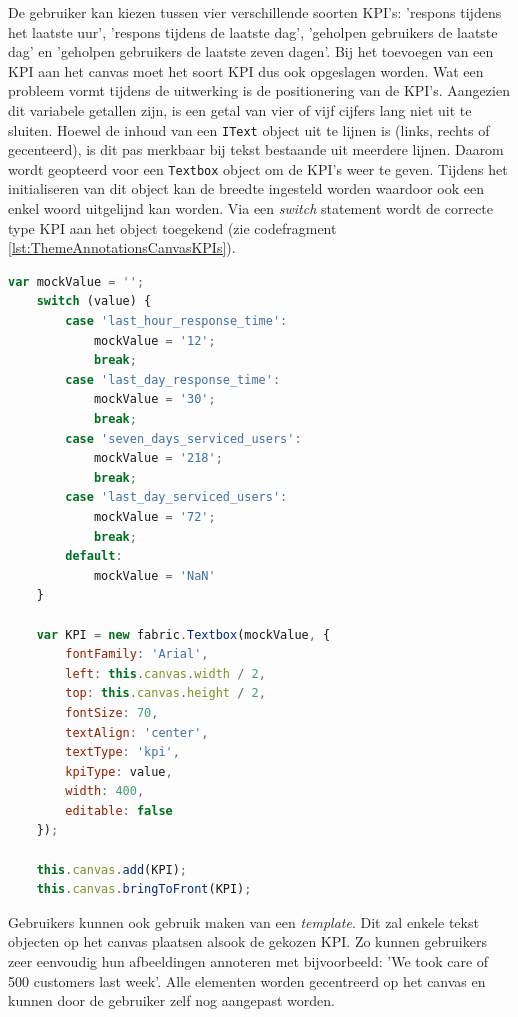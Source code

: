De gebruiker kan kiezen tussen vier verschillende soorten KPI's: 'respons tijdens het laatste uur', 'respons tijdens de laatste dag', 'geholpen gebruikers de laatste dag' en 'geholpen gebruikers de laatste zeven dagen'. Bij het toevoegen van een KPI aan het canvas moet het soort KPI dus ook opgeslagen worden. %
Wat een probleem vormt tijdens de uitwerking is de positionering van de KPI's. Aangezien dit variabele getallen zijn, is een getal van vier of vijf cijfers lang niet uit te sluiten. Hoewel de inhoud van een \texttt{IText} object uit te lijnen is (links, rechts of gecenteerd), is dit pas merkbaar bij tekst bestaande uit meerdere lijnen. Daarom wordt geopteerd voor een \texttt{Textbox} object om de KPI's weer te geven. Tijdens het initialiseren van dit object kan de breedte ingesteld worden waardoor ook een enkel woord uitgelijnd kan worden. Via een \textit{switch} statement wordt de correcte type KPI aan het object toegekend (zie codefragment \ref{lst:ThemeAnnotationsCanvasKPIs}). 

\begin{lstlisting}[caption={ThemeAnnotations component - KPI's toevoegen aan het canvas}, label={lst:ThemeAnnotationsCanvasKPIs},language=javascript]
	var mockValue = '';
	switch (value) {
		case 'last_hour_response_time':
			mockValue = '12';
			break;
		case 'last_day_response_time':
			mockValue = '30';
			break;
		case 'seven_days_serviced_users':
			mockValue = '218';
			break;
		case 'last_day_serviced_users':
			mockValue = '72';
			break;
		default:
			mockValue = 'NaN'
	}
	
	var KPI = new fabric.Textbox(mockValue, {
		fontFamily: 'Arial',
		left: this.canvas.width / 2,
		top: this.canvas.height / 2,
		fontSize: 70,
		textAlign: 'center',
		textType: 'kpi',
		kpiType: value,
		width: 400,
		editable: false
	});
	
	this.canvas.add(KPI);
	this.canvas.bringToFront(KPI);
\end{lstlisting}

Gebruikers kunnen ook gebruik maken van een \textit{template}. Dit zal enkele tekst objecten op het canvas plaatsen alsook de gekozen KPI. Zo kunnen gebruikers zeer eenvoudig hun afbeeldingen annoteren met bijvoorbeeld: 'We took care of 500 customers last week'. Alle elementen worden gecentreerd op het canvas en kunnen door de gebruiker zelf nog aangepast worden. 

